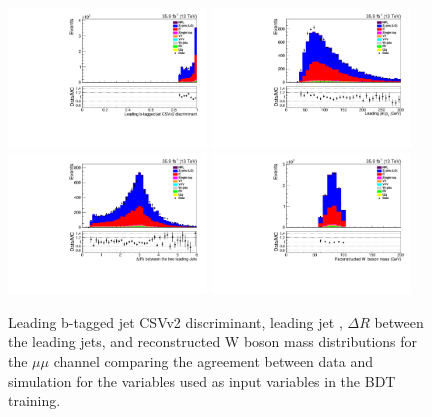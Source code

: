 \begin{figure}[htb]
\centering
\includegraphics[width=0.47\textwidth]{figs/background-estimation/plots/unblinded/prompt_mumu_ttbarInc/bTagDisc_NPL_mumu_wMass_mumu.pdf}
\includegraphics[width=0.47\textwidth]{figs/background-estimation/plots/unblinded/prompt_mumu_ttbarInc/leadingJetPt_NPL_mumu_wMass_mumu.pdf}
\\
\includegraphics[width=0.47\textwidth]{figs/background-estimation/plots/unblinded/prompt_mumu_ttbarInc/jjDelR_NPL_mumu_wMass_mumu.pdf}
\includegraphics[width=0.47\textwidth]{figs/background-estimation/plots/unblinded/prompt_mumu_ttbarInc/wPairMass_NPL_mumu_wMass_mumu.pdf}
\caption{
Leading b-tagged jet CSVv2 discriminant, leading jet \pT, $\Delta R$ between the leading jets, and reconstructed W boson mass distributions for the $\mu\mu$ channel comparing the agreement between data and simulation for the variables used as input variables in the BDT training.}
\label{fig:appInputFeaturesDataSimAgreement11}
\end{figure}

